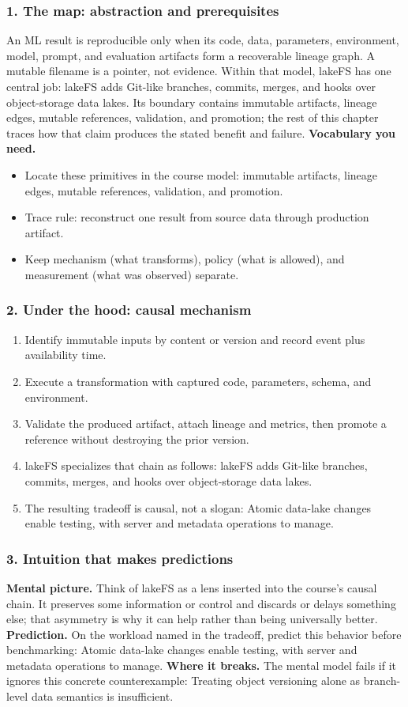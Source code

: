 \subsubsection*{1. The map: abstraction and prerequisites}
An ML result is reproducible only when its code, data, parameters, environment, model, prompt, and evaluation artifacts form a recoverable lineage graph. A mutable filename is a pointer, not evidence.
Within that model, lakeFS has one central job: lakeFS adds Git-like branches, commits, merges, and hooks over object-storage data lakes. Its boundary contains immutable artifacts, lineage edges, mutable references, validation, and promotion; the rest of this chapter traces how that claim produces the stated benefit and failure.
\textbf{Vocabulary you need.}\begin{itemize}
\item Locate these primitives in the course model: immutable artifacts, lineage edges, mutable references, validation, and promotion.
\item Trace rule: reconstruct one result from source data through production artifact.
\item Keep mechanism (what transforms), policy (what is allowed), and measurement (what was observed) separate.
\end{itemize}
\subsubsection*{2. Under the hood: causal mechanism}\begin{enumerate}
\item Identify immutable inputs by content or version and record event plus availability time.
\item Execute a transformation with captured code, parameters, schema, and environment.
\item Validate the produced artifact, attach lineage and metrics, then promote a reference without destroying the prior version.
\item lakeFS specializes that chain as follows: lakeFS adds Git-like branches, commits, merges, and hooks over object-storage data lakes.
\item The resulting tradeoff is causal, not a slogan: Atomic data-lake changes enable testing, with server and metadata operations to manage.
\end{enumerate}
\subsubsection*{3. Intuition that makes predictions}
\textbf{Mental picture.} Think of lakeFS as a lens inserted into the course's causal chain. It preserves some information or control and discards or delays something else; that asymmetry is why it can help rather than being universally better.
\textbf{Prediction.} On the workload named in the tradeoff, predict this behavior before benchmarking: Atomic data-lake changes enable testing, with server and metadata operations to manage.
\textbf{Where it breaks.} The mental model fails if it ignores this concrete counterexample: Treating object versioning alone as branch-level data semantics is insufficient.

